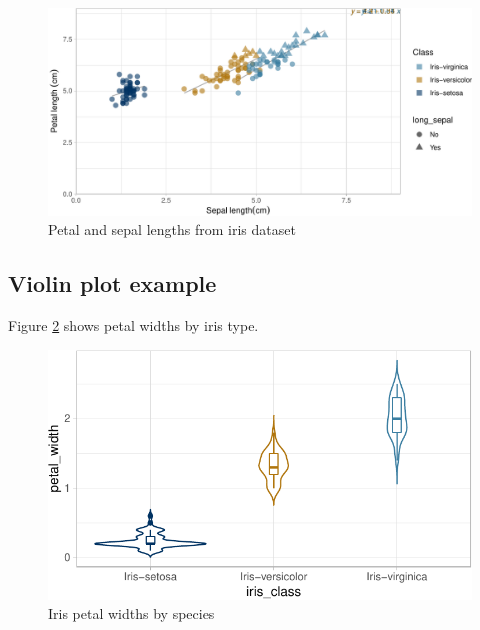 \documentclass[]{elsarticle} %
\begin{document}
\begin{figure}[h]

{\centering \includegraphics{Manuscript_files/figure-latex/irises-1} 

}

\caption{Petal and sepal lengths from iris dataset}\label{fig:irises}
\end{figure}

\hypertarget{violin-plot-example}{%
\subsection{Violin plot example}\label{violin-plot-example}}

Figure \ref{fig:petalwidths} shows petal widths by iris type.

\begin{figure}[h]

{\centering \includegraphics{Manuscript_files/figure-latex/petalwidths-1} 

}

\caption{Iris petal widths by species}\label{fig:petalwidths}
\end{figure}
\end{document}
